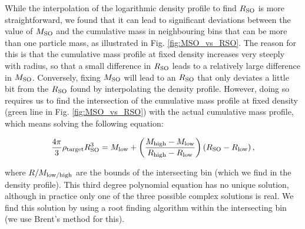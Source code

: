 \documentclass{article}
\begin{document}
While the interpolation of the logarithmic density profile to find $R_{\rm{}SO}$ is more straightforward, we 
found that it can lead to significant deviations between the value of $M_{\rm{}SO}$ and the cumulative mass in 
neighbouring bins that can be more than one particle mass, as illustrated in Fig. \ref{fig:MSO_vs_RSO}. The 
reason for this is that the cumulative mass profile at fixed density increases very steeply with radius, so 
that a small difference in $R_{\rm{}SO}$ leads to a relatively large difference in $M_{\rm{}SO}$. Conversely, 
fixing $M_{\rm{}SO}$ will lead to an $R_{\rm{}SO}$ that only deviates a little bit from the $R_{\rm{}SO}$ 
found by interpolating the density profile. However, doing so requires us to find the intersection of the 
cumulative mass profile at fixed density (green line in Fig. \ref{fig:MSO_vs_RSO}) with the actual cumulative 
mass profile, which means solving the following equation:

\begin{equation}
    \frac{4\pi{}}{3} \rho{}_{\rm{}target} R_{\rm{}SO}^3 = M_{\rm{}low} + \left( \frac{M_{\rm{}high}-M_{\rm{}low}}{R_{\rm{}high} - R_{\rm{}low}} \right) \left(R_{\rm{}SO} - R_{\rm{}low}\right),
    \label{eq:RSO}
\end{equation}

where $R/M_{\rm{}low/high}$ are the bounds of the intersecting bin (which we find in the density profile). 
This third degree polynomial equation has no unique solution, although in practice only one of the three 
possible complex solutions is real. We find this solution by using a root finding algorithm within the 
intersecting bin (we use Brent's method for this).
\end{document}
